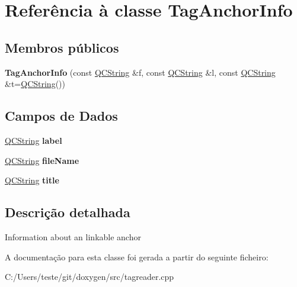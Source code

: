 \hypertarget{class_tag_anchor_info}{\section{Referência à classe Tag\-Anchor\-Info}
\label{class_tag_anchor_info}
}
\subsection*{Membros públicos}
\begin{DoxyCompactItemize}
\item 
\hypertarget{class_tag_anchor_info_a937a9640abd544273bf74f4c588ef9e2}{{\bfseries Tag\-Anchor\-Info} (const \hyperlink{class_q_c_string}{Q\-C\-String} \&f, const \hyperlink{class_q_c_string}{Q\-C\-String} \&l, const \hyperlink{class_q_c_string}{Q\-C\-String} \&t=\hyperlink{class_q_c_string}{Q\-C\-String}())}\label{class_tag_anchor_info_a937a9640abd544273bf74f4c588ef9e2}

\end{DoxyCompactItemize}
\subsection*{Campos de Dados}
\begin{DoxyCompactItemize}
\item 
\hypertarget{class_tag_anchor_info_ad961cc9bd17b7533dc02fe0826647dc7}{\hyperlink{class_q_c_string}{Q\-C\-String} {\bfseries label}}\label{class_tag_anchor_info_ad961cc9bd17b7533dc02fe0826647dc7}

\item 
\hypertarget{class_tag_anchor_info_abb9cd3e430c4eaf05aa259fa96f32305}{\hyperlink{class_q_c_string}{Q\-C\-String} {\bfseries file\-Name}}\label{class_tag_anchor_info_abb9cd3e430c4eaf05aa259fa96f32305}

\item 
\hypertarget{class_tag_anchor_info_a42bb80709d086df855babb087e63794b}{\hyperlink{class_q_c_string}{Q\-C\-String} {\bfseries title}}\label{class_tag_anchor_info_a42bb80709d086df855babb087e63794b}

\end{DoxyCompactItemize}


\subsection{Descrição detalhada}
Information about an linkable anchor 

A documentação para esta classe foi gerada a partir do seguinte ficheiro\-:\begin{DoxyCompactItemize}
\item 
C\-:/\-Users/teste/git/doxygen/src/tagreader.\-cpp\end{DoxyCompactItemize}
